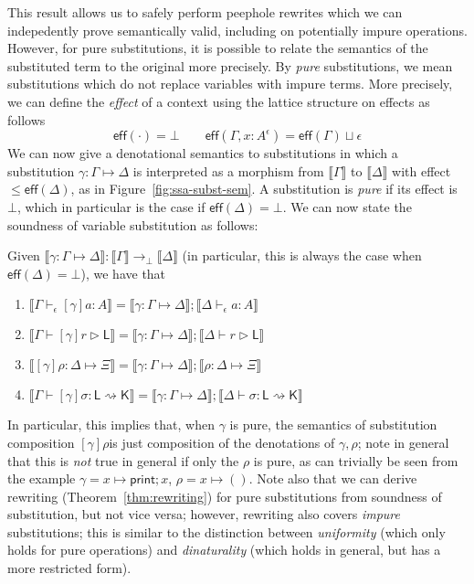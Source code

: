 \documentclass[acmsmall,screen,review]{acmart}
\newcommand{\ms}[1]{\ensuremath{\mathsf{#1}}}
\newcommand{\thyp}[3]{#1 : {#2}^{#3}}
\newcommand{\hasty}[4]{#1 \vdash_{#2} #3: {#4}}
\newcommand{\haslb}[3]{#1 \vdash #2 \rhd #3}
\newcommand{\issubst}[3]{#1: #2 \mapsto #3}
\newcommand{\lbsubst}[4]{#1 \vdash #2: #3 \rightsquigarrow #4}
\newcommand{\dnt}[1]{\llbracket{#1}\rrbracket}
\begin{document}
This result allows us to safely perform peephole rewrites which we can indepedently prove
semantically valid, including on potentially impure operations. However, for pure substitutions, it
is possible to relate the semantics of the substituted term to the original more precisely. By
\emph{pure} substitutions, we mean substitutions which do not replace variables with impure terms.
More precisely, we can define the \emph{effect} of a context using the lattice structure on effects
as follows
\begin{equation}
  \ms{eff}(\cdot) = \bot \qquad 
  \ms{eff}(\Gamma, \thyp{x}{A}{\epsilon}) = \ms{eff}(\Gamma) \sqcup \epsilon
\end{equation}
We can now give a denotational semantics to substitutions in which a substitution
$\issubst{\gamma}{\Gamma}{\Delta}$ is interpreted as a morphism from $\dnt{\Gamma}$ to
$\dnt{\Delta}$ with effect $\leq \ms{eff}(\Delta)$, as in Figure~\ref{fig:ssa-subst-sem}. A
substitution is \emph{pure} if its effect is $\bot$, which in particular is the case if
$\ms{eff}(\Delta) = \bot$. We can now state the soundness of variable substitution as follows:
\begin{theorem}
  Given $\dnt{\issubst{\gamma}{\Gamma}{\Delta}} : \dnt{\Gamma} \to_\bot \dnt{\Delta}$ (in
  particular, this is always the case when $\ms{eff}(\Delta) = \bot$), we have that
  \begin{enumerate}[label=(\alph*)]
    \item $\dnt{\hasty{\Gamma}{\epsilon}{[\gamma]a}{A}} 
      = \dnt{\issubst{\gamma}{\Gamma}{\Delta}};\dnt{\hasty{\Delta}{\epsilon}{a}{A}}$
    \item $\dnt{\haslb{\Gamma}{[\gamma]r}{\ms{L}}}
      = \dnt{\issubst{\gamma}{\Gamma}{\Delta}};\dnt{\haslb{\Delta}{r}{\ms{L}}}$
    \item $\dnt{\issubst{[\gamma]\rho}{\Delta}{\Xi}}
      = \dnt{\issubst{\gamma}{\Gamma}{\Delta}};\dnt{\issubst{\rho}{\Delta}{\Xi}}$
    \item $\dnt{\lbsubst{\Gamma}{[\gamma]\sigma}{\ms{L}}{\ms{K}}}
      = \dnt{\issubst{\gamma}{\Gamma}{\Delta}};\dnt{\lbsubst{\Delta}{\sigma}{\ms{L}}{\ms{K}}}$
  \end{enumerate}
  \label{thm:subst-sound}
\end{theorem}
In particular, this implies that, when $\gamma$ is pure, the semantics of substitution composition
$[\gamma]\rho$is just composition of the denotations of $\gamma, \rho$; note in general that this is
\emph{not} true in general if only the $\rho$ is pure, as can trivially be seen from the example
\(\gamma = x \mapsto \ms{print}; x\), \(\rho = x \mapsto ()\). Note also that we can derive
rewriting (Theorem~\ref{thm:rewriting}) for pure substitutions from soundness of substitution, but
not vice versa; however, rewriting also covers \emph{impure} substitutions; this is similar to the
distinction between \emph{uniformity} (which only holds for pure operations) and \emph{dinaturality}
(which holds in general, but has a more restricted form).
\end{document}
